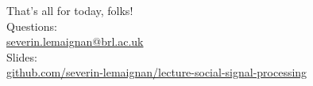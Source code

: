 \documentclass[compress,xcolor=table]{beamer}
\makeatletter
\def\beamer@writeslidentry@miniframesoff{%
  \expandafter\beamer@ifempty\expandafter{\beamer@framestartpage}{}%
  {%
    \clearpage\beamer@notesactions%
  }
}
\newcommand*{\miniframesoff}{\let\beamer@writeslidentry=\beamer@writeslidentry@miniframesoff}
\makeatother
\begin{document}
\miniframesoff

\begin{frame}{}
    \begin{center}
        \Large
        That's all for today, folks!\\[2em]
        \normalsize
        Questions:\\
        \url{severin.lemaignan@brl.ac.uk} \\[1em]

        Slides:\\ \href{https://github.com/severin-lemaignan/lecture-social-signal-processing}{\small github.com/severin-lemaignan/lecture-social-signal-processing}

    \end{center}
\end{frame}
\end{document}
